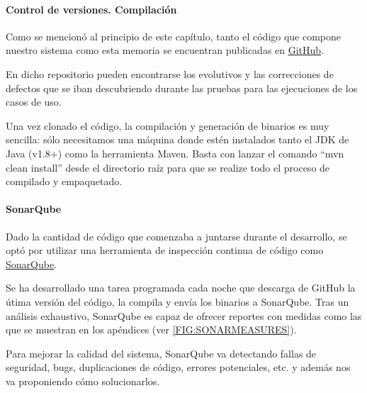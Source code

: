 \paragraph{Control de versiones. Compilación}
Como se mencionó al principio de este capítulo, tanto el código que compone nuestro sistema como esta memoria se encuentran publicadas en \href{https://github.com/plyskor/TweetExtractor}{GitHub}. 

En dicho repositorio pueden encontrarse los evolutivos y las correcciones de defectos que se iban descubriendo durante las pruebas para las ejecuciones de los casos de uso.
 
 Una vez clonado el código, la compilación y generación de binarios es muy sencilla: sólo necesitamos una máquina donde estén instalados tanto el JDK de Java (v1.8+) como la herramienta Maven. Basta con lanzar el comando ``mvn clean install'' desde el directorio raíz para que se realize todo el proceso de compilado y empaquetado.
 
\paragraph{SonarQube}
Dado la cantidad de código que comenzaba a juntarse durante el desarrollo, se optó por utilizar una herramienta de inspección continua de código como \href{https://www.sonarqube.org/}{SonarQube}. 

Se ha desarrollado una tarea programada cada noche que descarga de GitHub la útima versión del código, la compila y envía los binarios a SonarQube. Tras un análisis exhaustivo, SonarQube es capaz de ofrecer reportes con medidas como las que se muestran en los apéndices (ver \ref{FIG:SONARMEASURES}).

Para mejorar la calidad del sistema, SonarQube va detectando fallas de seguridad, bugs, duplicaciones de código, errores potenciales, etc. y además nos va proponiendo cómo solucionarlos.

